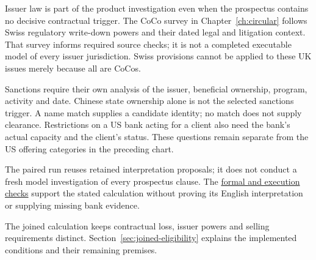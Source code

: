 Issuer law is part of the product investigation even when the prospectus
contains no decisive contractual trigger. The CoCo survey in
Chapter~\ref{ch:circular} follows Swiss regulatory write-down powers and their
dated legal and litigation context. That survey informs required source checks;
it is not a completed executable model of every issuer jurisdiction. Swiss
provisions cannot be applied to these UK issues merely because all are CoCos.

Sanctions require their own analysis of the issuer, beneficial ownership,
program, activity and date. Chinese state ownership alone is not the selected
sanctions trigger. A name match supplies a candidate identity; no match does
not supply clearance. Restrictions on a US bank acting for a client also need
the bank's actual capacity and the client's status. These questions remain
separate from the US offering categories in the preceding chart.

The paired run reuses retained interpretation proposals; it does not conduct a
fresh model investigation of every prospectus clause. The
\hyperref[map:certificates]{formal and execution checks} support the stated
calculation without proving its English interpretation or supplying missing
bank evidence.

\clearpage
{}
The joined calculation keeps contractual loss, issuer powers and selling
requirements distinct. Section~\ref{sec:joined-eligibility} explains the
implemented conditions and their remaining premises.

